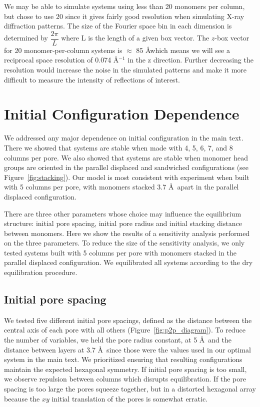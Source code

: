 \documentclass{article}
\begin{document}
  We may be able to simulate systems using less than 20 monomers per column, but chose
  to use 20 since it gives fairly good resolution when simulating X-ray diffraction 
  patterns. The size of the Fourier space bin in each dimension is determined by 
  $\dfrac{2\pi}{L}$ where L is the length of a given box vector. The $z$-box vector 
  for 20 monomer-per-column systems is $\approx$ 85 \AA which means we will see 
  a reciprocal space resolution of 0.074 \AA$^{-1}$ in the z direction. Further decreasing
  the resolution would increase the noise in the simulated patterns and make it more
  difficult to measure the intensity of reflections of interest.

  \section{Initial Configuration Dependence}\label{section:initial_config_dependence}

  We addressed any major dependence on initial configuration in the main text.
  There we showed that systems are stable when made with 4, 5, 6, 7, and 8
  columns per pore. We also showed that systems are stable when monomer head
  groups are oriented in the parallel displaced and sandwiched configurations
  (see Figure~\ref{fig:stacking}). Our model is most consistent with experiment
  when built with 5 columns per pore, with monomers stacked 3.7 \AA~apart in 
  the parallel displaced configuration. 

  There are three other parameters whose choice may influence the equilibrium
  structure: initial pore spacing, initial pore radius and initial stacking distance
  between monomers. Here we show the results of a sensitivity analysis performed
  on the three parameters. To reduce the size of the sensitivity analysis, we
  only tested systems built with 5 columns per pore with monomers stacked in 
  the parallel displaced configuration. We equilibrated all systems according
  to the dry equilibration procedure.

  \subsection{Initial pore spacing}\label{section:initial_pore_spacing}

  We tested five different initial pore spacings, defined as the
  distance between the central axis of each pore with all others
  (Figure~\ref{fig:p2p_diagram}). To reduce the number of variables, we held the
  pore radius constant, at 5 \AA~and the distance between layers at 3.7 \AA~since
  those were the values used in our optimal system in the main text. We
  prioritized ensuring that resulting configurations maintain the expected
  hexagonal symmetry. If initial pore spacing is too small, we observe repulsion
  between columns which disrupts equilibration. If the pore spacing is too large
  the pores squeeze together, but in a distorted hexagonal array because the $xy$
  initial translation of the pores is somewhat erratic. 
\end{document}
